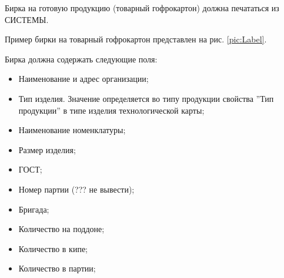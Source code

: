 \label{print:label}


Бирка на готовую продукцию (товарный гофрокартон) должна печататься из СИСТЕМЫ.

Пример бирки на товарный гофрокартон представлен на рис. \ref{pic:Label}.

Бирка должна содержать следующие поля:
\begin{itemize}
    \item Наименование и адрес организации;
    \item Тип изделия. Значение определяется во типу продукции свойства ''Тип продукции'' в типе изделия технологической карты;
    \item Наименование номенклатуры;
    \item Размер изделия;
    \item ГОСТ;
    \item Номер партии (??? не вывести);
    
    \item Бригада;
    \item Количество на поддоне;
    \item Количество в кипе;
    \item Количество в партии;
    

\end{itemize}
